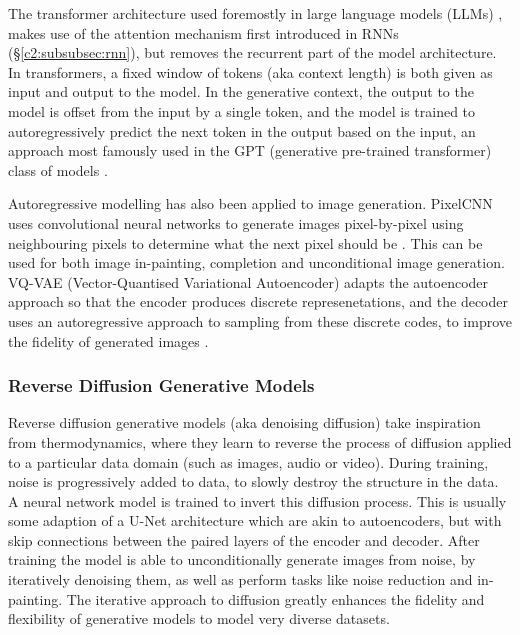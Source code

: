 The transformer architecture used foremostly in large language models (LLMs) \citep{vaswani2017attention}, makes use of the attention mechanism first introduced in RNNs \citep{bahdanau2014neural} (\S \ref{c2:subsubsec:rnn}), but removes the recurrent part of the model architecture.
In transformers, a fixed window of tokens (aka context length) is both given as input and output to the model.
In the generative context, the output to the model is offset from the input by a single token, and the model is trained to autoregressively predict the next token in the output based on the input, an approach most famously used in the GPT (generative pre-trained transformer) class of models \citep{radford2018improving, radford2019language,brown2020language}.

Autoregressive modelling has also been applied to image generation.
PixelCNN uses convolutional neural networks to generate images pixel-by-pixel using neighbouring pixels to determine what the next pixel should be \citep{van2016conditional}.
This can be used for both image in-painting, completion and unconditional image generation.
VQ-VAE (Vector-Quantised Variational Autoencoder) adapts the autoencoder approach so that the encoder produces discrete represenetations, and the decoder uses an autoregressive approach to sampling from these discrete codes, to improve the fidelity of generated images \citep{van2017neural}. 

\subsubsection{Reverse Diffusion Generative Models}
\label{c2:subsubsec:diffusion}

Reverse diffusion generative models (aka denoising diffusion) take inspiration from thermodynamics, where they learn to reverse the process of diffusion applied to a particular data domain \citep{sohl2015deep} (such as images, audio or video). 
During training, noise is progressively added to data, to slowly destroy the structure in the data.
A neural network model is trained to invert this diffusion process. This is usually some adaption of a U-Net architecture \citep{ronneberger2015u} which are akin to autoencoders, but with skip connections between the paired layers of the encoder and decoder.
After training the model is able to unconditionally generate images from noise, by iteratively denoising them, as well as perform tasks like noise reduction and in-painting. 
The iterative approach to diffusion greatly enhances the fidelity and flexibility of generative models to model very diverse datasets.

